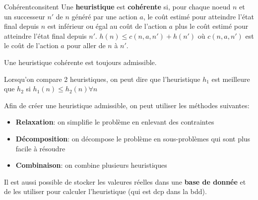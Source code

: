 \documentclass[a4paper, 12pt]{extarticle}
\begin{document}
\begin{definition}{Cohérent}{consitent}
    Une \textbf{heuristique} est \textbf{cohérente} si, pour chaque noeud $n$ et un successeur $n'$ de $n$ généré par une action $a$,
    le coût estimé pour atteindre l'état final depuis $n$ est inférieur ou égal au coût de l'action $a$ plus le coût estimé pour atteindre l'état final depuis $n'$. 
    \begin{math}
        h(n) \leq c(n, a, n') + h(n') 
    \end{math} 
    où $c(n, a, n')$ est le coût de l'action $a$ pour aller de $n$ à $n'$. 
\end{definition}

\begin{remark}\leavevmode
    Une heuristique cohérente est toujours admissible. 
\end{remark}

\begin{note}
    Lorsqu'on compare 2 heuristiques, on peut dire que l'heuristique $h_1$ est meilleure que $h_2$ si 
    \begin{math}
        h_1(n) \leq h_2(n) \forall n 
    \end{math}
\end{note}

Afin de créer une heuristique admissible, on peut utiliser les méthodes suivantes: 
\begin{itemize}
    \item \textbf{Relaxation}: on simplifie le problème en enlevant des contraintes
    \item \textbf{Décomposition}: on décompose le problème en sous-problèmes qui sont plus facile à résoudre
    \item \textbf{Combinaison}: on combine plusieurs heuristiques 
\end{itemize}

Il est aussi possible de stocker les valeures réelles dans une \textbf{base de donnée} 
et de les utiliser pour calculer l'heuristique (qui est dcp dans la bdd).











\end{document}
